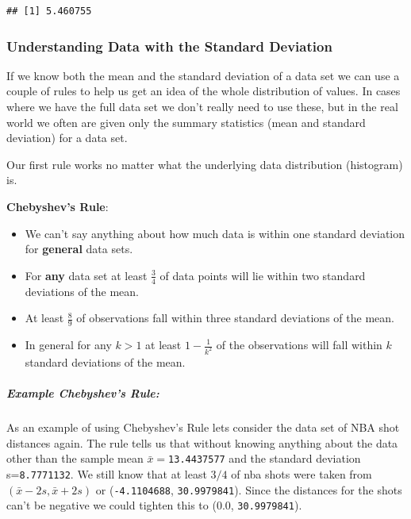 \documentclass[
]{book}
\providecommand{\tightlist}{%
  \setlength{\itemsep}{0pt}\setlength{\parskip}{0pt}}
\theoremstyle{definition}
\theoremstyle{definition}
\theoremstyle{definition}
\theoremstyle{definition}
\theoremstyle{remark}
\begin{document}
\begin{verbatim}
## [1] 5.460755
\end{verbatim}

\hypertarget{understanding-data-with-the-standard-deviation}{%
\subsubsection{Understanding Data with the Standard Deviation}\label{understanding-data-with-the-standard-deviation}}

If we know both the mean and the standard deviation of a data set we can use a couple of rules to help us get an idea of the whole distribution of values. In cases where we have the full data set we don't really need to use these, but in the real world we often are given only the summary statistics (mean and standard deviation) for a data set.

Our first rule works no matter what the underlying data distribution (histogram) is.

\textbf{Chebyshev's Rule}:

\begin{itemize}
\tightlist
\item
  We can't say anything about how much data is within one standard deviation for \textbf{general} data sets.
\item
  For \textbf{any} data set at least \(\frac{3}{4}\) of data points will lie within two standard deviations of the mean.
\item
  At least \(\frac{8}{9}\) of observations fall within three standard deviations of the mean.
\item
  In general for any \(k>1\) at least \(1-\frac{1}{k^2}\) of the observations will fall within \(k\) standard deviations of the mean.
\end{itemize}

\hypertarget{example-chebyshevs-rule}{%
\subparagraph{Example Chebyshev's Rule:}\label{example-chebyshevs-rule}}

As an example of using Chebyshev's Rule lets consider the data set of NBA shot distances again. The rule tells us that without knowing anything about the data other than the sample mean \(\bar{x}=\)\texttt{13.4437577} and the standard deviation s=\texttt{8.7771132}. We still know that at least \(3/4\) of nba shots were taken from \((\bar{x}-2s, \bar{x}+2s)\) or (\texttt{-4.1104688}, \texttt{30.9979841}). Since the distances for the shots can't be negative we could tighten this to (0.0, \texttt{30.9979841}).
\end{document}
